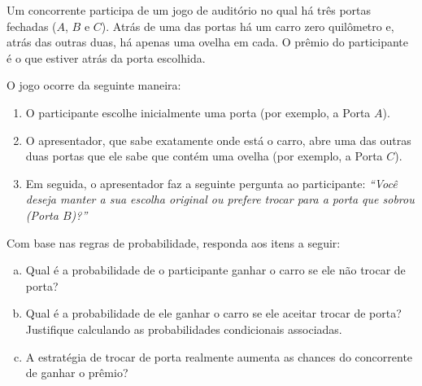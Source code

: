 %
%


\begin{exercicioBanco}[\valorquestao]
Um concorrente participa de um jogo de auditório no qual há três portas fechadas ($A$, $B$ e $C$). Atrás de uma das portas há um carro zero quilômetro e, atrás das outras duas, há apenas uma ovelha em cada. O prêmio do participante é o que estiver atrás da porta escolhida. 

O jogo ocorre da seguinte maneira:
\begin{enumerate}[1.]
    \item O participante escolhe inicialmente uma porta (por exemplo, a Porta $A$).
    \item O apresentador, que sabe exatamente onde está o carro, abre uma das outras duas portas que ele sabe que contém uma ovelha (por exemplo, a Porta $C$).
    \item Em seguida, o apresentador faz a seguinte pergunta ao participante: \textit{“Você deseja manter a sua escolha original ou prefere trocar para a porta que sobrou (Porta $B$)?”}
\end{enumerate}

Com base nas regras de probabilidade, responda aos itens a seguir:

\begin{enumerate}[(a)]
    \item Qual é a probabilidade de o participante ganhar o carro se ele não trocar de porta?
    \item Qual é a probabilidade de ele ganhar o carro se ele aceitar trocar de porta? Justifique calculando as probabilidades condicionais associadas.
    \item A estratégia de trocar de porta realmente aumenta as chances do concorrente de ganhar o prêmio?
\end{enumerate}
\end{exercicioBanco}


